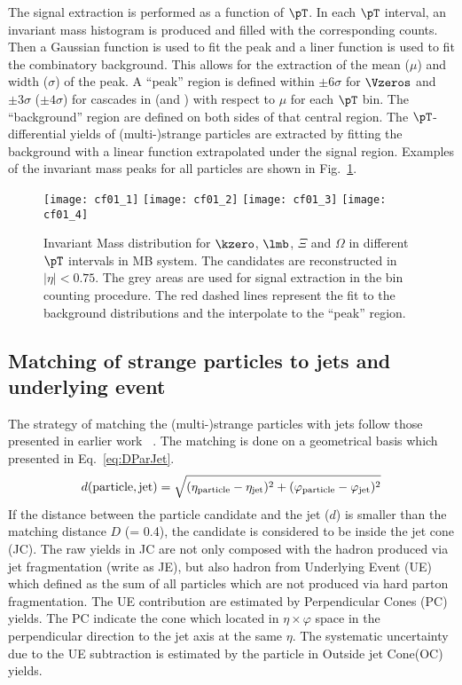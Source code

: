 The signal extraction is performed as a function of $\pT$.
In each $\pT$ interval, an invariant mass histogram is produced and filled with the corresponding counts.
Then a Gaussian function is used to fit the peak and a liner function is used to fit the combinatory background.
This allows for the extraction of the mean ($\mu$) and width ($\sigma$) of the peak.
A ``peak'' region is defined within $\pm 6\sigma$ for $\Vzeros$ and $\pm 3\sigma$ ($\pm 4\sigma$) for cascades in \pp (and \pPb) with respect to $\mu$ for each $\pT$ bin.
The ``background'' region are defined on both sides of that central region.
The $\pT$-differential yields of (multi-)strange particles are extracted by fitting the background with a linear function extrapolated under the signal region.
Examples of the invariant mass peaks for all particles are shown in Fig.~\ref{fig:InvM}.
\begin{figure}[!ht]
\begin{center}
\texttt{[image: cf01\_1]}
\texttt{[image: cf01\_2]}
\texttt{[image: cf01\_3]}
\texttt{[image: cf01\_4]}
\caption{Invariant Mass distribution for $\kzero$, $\lmb$, $\Xi$ and $\Omega$ in different $\pT$ intervals in MB \pPb system. The candidates are reconstructed in $|\eta|<0.75$.
The grey areas are used for signal extraction in the bin counting procedure.
The red dashed lines represent the fit to the background distributions and the interpolate to the ``peak'' region.}
\label{fig:InvM}
\end{center}
\end{figure}

\subsection{Matching of strange particles to jets and underlying event}%
\label{sec:ParJetMatch}

The strategy of matching the (multi-)strange particles with jets follow those presented in earlier work~\cite{V0injet} .
The matching is done on a geometrical basis which presented in Eq.~\ref{eq:DParJet}.
\begin{equation}
	d(\mathrm{particle, jet}) = \sqrt{(\eta_\mathrm{particle} -\eta_{\rm jet})^{2} + (\varphi_\mathrm{particle} -\varphi_{\rm jet})^{2}}
	\label{eq:DParJet}
\end{equation}
If the distance between the particle candidate and the jet ($d$) is smaller than the matching distance $D$ (= 0.4), the candidate is considered to be inside the jet cone (JC).
The raw yields in JC are not only composed with the hadron produced via jet fragmentation (write as JE), but also hadron from Underlying Event (UE) which defined as the sum of all particles which are not produced via hard parton fragmentation.
The UE contribution are estimated by Perpendicular Cones (PC) yields.
The PC indicate the cone which located in $\eta \times \varphi$ space in the perpendicular direction to the jet axis at the same $\eta$.
The systematic uncertainty due to the UE subtraction is estimated by the particle in Outside jet Cone(OC) yields. 

